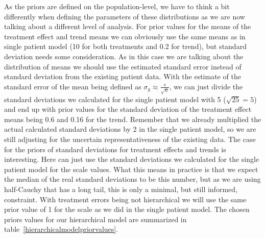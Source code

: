 \documentclass[12pt,a4paper,leqno]{report}
\theoremstyle{plain}
\theoremstyle{definition}
\theoremstyle{remark}
\begin{document}
As the priors are defined on the population-level, we have to think a bit differently when defining the
parameters of these distributions as we are now talking about a different level of
analysis. For prior values for the means of the treatment effect and trend means
we can obviously use the same means as in single patient model (10 for both treatments and 0.2 for
trend), but standard deviation needs some consideration. As in this case we are talking about the
distribution of means we should use the estimated standard error instead of standard
deviation from the existing patient data. With the estimate of the standard error of the mean being defined as
\( \sigma_{y} \approx \frac{s}{\sqrt{n}} \), we can just divide the standard deviations
we calculated for the single patient model with 5 (\(\sqrt{25} = 5\)) and end up with
prior values for the standard deviation of the treatment effect means being 0.6 and 0.16 for the trend. Remember that
we already multiplied the actual calculated standard deviations by 2 in the single
patient model, so we are still adjusting for the uncertain representativeness of the
existing data. The case for the priors of standard deviations for treatment effects and
trends is interesting. Here can just use the standard deviations we calculated for
the single patient model for the scale values. What this means in practice is that we expect the
median of the real standard deviations to be this number, but as we are using
half-Cauchy that has a long tail, this is only a minimal, but still informed,
constraint. With treatment errors being not hierarchical we will use the same prior value
of 1 for the scale as we did in the single patient model. The chosen priors values for
our hierarchical model are summarized in table\ \ref{hierarchicalmodelpriorvalues}.
\end{document}
